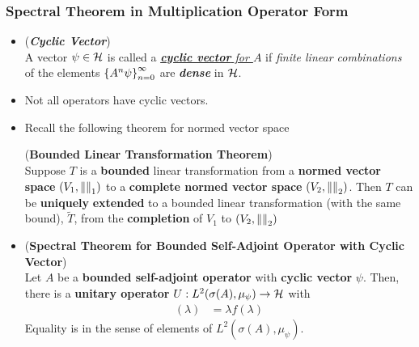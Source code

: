 \documentclass[11pt]{article}
\begin{document}
\subsubsection{Spectral Theorem in Multiplication Operator Form}
\begin{itemize}
\item \begin{definition} (\emph{\textbf{Cyclic Vector}})\\
A vector $\psi \in {\mathcal H}$ is called a \emph{\underline{\textbf{cyclic vector} for $A$}} if \emph{finite linear combinations} of the elements $\left\{A^{n}\psi\right\}_{n=0}^{\infty}$ are \emph{\textbf{dense}} in ${\mathcal H}$. 
\end{definition}

\item \begin{remark}
Not all operators have cyclic vectors.
\end{remark}

\item Recall the following theorem for normed vector space
\begin{theorem} (\textbf{Bounded Linear Transformation Theorem}) \citep{reed1980methods}\\
Suppose $T$ is a \textbf{bounded} linear transformation from a \textbf{normed vector space} $(V_1, \left\|\right\|_{1})$ to a \textbf{complete normed vector space} $(V_2, \left\|\right\|_{2})$. Then $T$ can be \textbf{uniquely} \textbf{extended} to a bounded linear transformation (with the same bound), $\widetilde{T}$, from the \textbf{completion} of $V_1$ to $(V_2,\left\|\right\|_{2})$
\end{theorem}


\item \begin{lemma} (\textbf{Spectral Theorem for Bounded Self-Adjoint Operator with Cyclic Vector}) \citep{reed1980methods}\\
Let $A$ be a \textbf{bounded self-adjoint operator} with \textbf{cyclic vector} $\psi$.  Then, there is a \textbf{unitary operator} $U:  L^2(\sigma(A), \mu_{\psi}) \rightarrow {\mathcal H}$ with
\begin{align*}
[U^{-1} A U f](\lambda) &= \lambda f(\lambda)
\end{align*} 
Equality is in the sense of elements of $L^2(\sigma(A), \mu_{\psi})$. 
\end{lemma}


\end{itemize}
\end{document}
